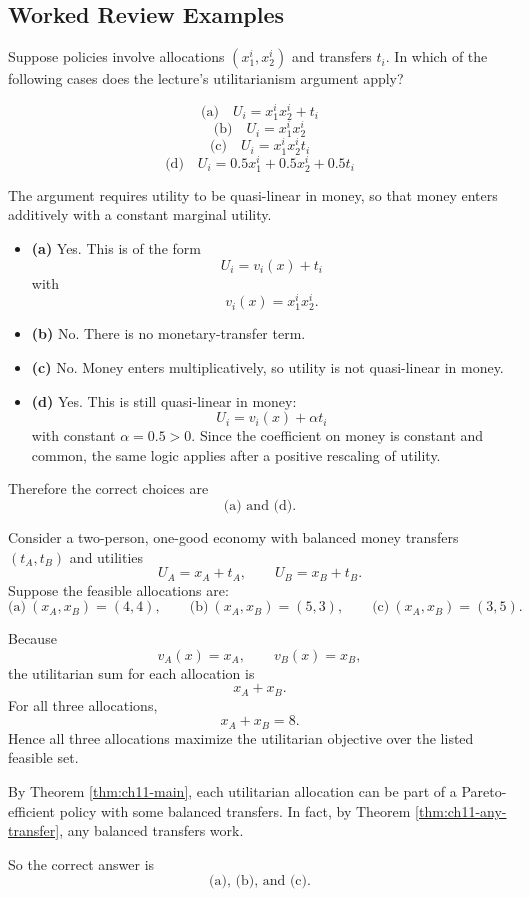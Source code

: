 \subsection{Worked Review Examples}

\begin{examplebox}[title={Worked Example: Which utility forms satisfy the utilitarianism argument?}]
Suppose policies involve allocations $(x_1^i,x_2^i)$ and transfers $t_i$. In which of the following cases does the lecture's utilitarianism argument apply?

\[
\text{(a)}\quad U_i = x_1^i x_2^i + t_i
\]
\[
\text{(b)}\quad U_i = x_1^i x_2^i
\]
\[
\text{(c)}\quad U_i = x_1^i x_2^i t_i
\]
\[
\text{(d)}\quad U_i = 0.5x_1^i + 0.5x_2^i + 0.5 t_i
\]

The argument requires utility to be quasi-linear in money, so that money enters additively with a constant marginal utility.

\begin{itemize}
    \item \textbf{(a)} Yes. This is of the form
    \[
    U_i = v_i(x)+t_i
    \]
    with
    \[
    v_i(x)=x_1^i x_2^i.
    \]
    \item \textbf{(b)} No. There is no monetary-transfer term.
    \item \textbf{(c)} No. Money enters multiplicatively, so utility is not quasi-linear in money.
    \item \textbf{(d)} Yes. This is still quasi-linear in money:
    \[
    U_i = v_i(x) + \alpha t_i
    \]
    with constant $\alpha=0.5>0$. Since the coefficient on money is constant and common, the same logic applies after a positive rescaling of utility.
\end{itemize}

Therefore the correct choices are
\[
\boxed{\text{(a) and (d).}}
\]
\end{examplebox}

\begin{examplebox}[title={Worked Example: Which allocations can be part of a Pareto-efficient policy?}]
Consider a two-person, one-good economy with balanced money transfers $(t_A,t_B)$ and utilities
\[
U_A=x_A+t_A,
\qquad
U_B=x_B+t_B.
\]
Suppose the feasible allocations are:
\[
\text{(a)}\ (x_A,x_B)=(4,4),
\qquad
\text{(b)}\ (x_A,x_B)=(5,3),
\qquad
\text{(c)}\ (x_A,x_B)=(3,5).
\]

Because
\[
v_A(x)=x_A,
\qquad
v_B(x)=x_B,
\]
the utilitarian sum for each allocation is
\[
x_A+x_B.
\]
For all three allocations,
\[
x_A+x_B=8.
\]
Hence all three allocations maximize the utilitarian objective over the listed feasible set.

By Theorem \ref{thm:ch11-main}, each utilitarian allocation can be part of a Pareto-efficient policy with some balanced transfers. In fact, by Theorem \ref{thm:ch11-any-transfer}, any balanced transfers work.

So the correct answer is
\[
\boxed{\text{(a), (b), and (c).}}
\]
\end{examplebox}

